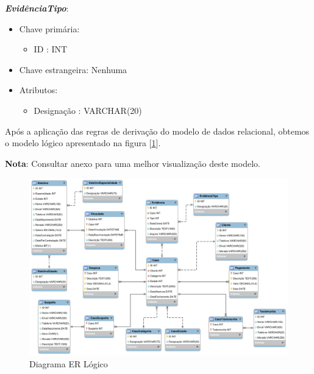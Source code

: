 \documentclass[a4paper,12pt]{scrreprt}
\begin{document}
        \vspace{0.5cm}
        
        \textbf{\textit{EvidênciaTipo}}:
        \begin{itemize}
            \item Chave primária:
                \begin{itemize}
                    \item ID : INT
                \end{itemize}
            \item Chave estrangeira: Nenhuma
            \item Atributos:
                \begin{itemize}
                    \item Designação : VARCHAR(20)
                \end{itemize}
        \end{itemize}

    \vspace{1cm}

    Após a aplicação das regras de derivação do modelo de dados relacional, obtemos o modelo lógico apresentado na figura [\ref{fig:4.4}].

    \textbf{Nota}: Consultar anexo \textit{} para uma melhor visualização deste modelo.

    \clearpage
    \begin{figure}[!ht]
        \centering
        \includegraphics[scale=0.70, angle=270]{images/modelo_logico/final.png}
        \caption{Diagrama ER Lógico}
        \label{fig:4.4}
    \end{figure}
\end{document}
